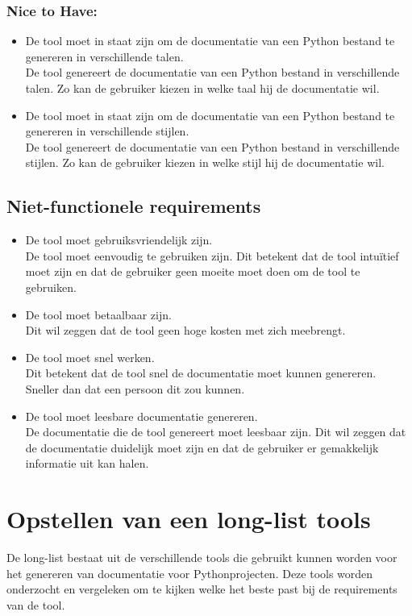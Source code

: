 \subsubsection{Nice to Have:}
\begin{itemize}
    \item De tool moet in staat zijn om de documentatie van een Python bestand te genereren in verschillende talen.\\
    De tool genereert de documentatie van een Python bestand in verschillende talen. Zo kan de gebruiker kiezen in welke taal hij de documentatie wil.
    \item De tool moet in staat zijn om de documentatie van een Python bestand te genereren in verschillende stijlen.\\
    De tool genereert de documentatie van een Python bestand in verschillende stijlen. Zo kan de gebruiker kiezen in welke stijl hij de documentatie wil.
\end{itemize}

\subsection{Niet-functionele requirements}
\label{sec:niet-functionele-requirements}
\begin{itemize}
    \item De tool moet gebruiksvriendelijk zijn.\\
    De tool moet eenvoudig te gebruiken zijn. Dit betekent dat de tool intuïtief moet zijn en dat de gebruiker geen moeite moet doen om de tool te gebruiken.
    \item De tool moet betaalbaar zijn.\\
    Dit wil zeggen dat de tool geen hoge kosten met zich meebrengt.
    \item De tool moet snel werken.\\
    Dit betekent dat de tool snel de documentatie moet kunnen genereren. Sneller dan dat een persoon dit zou kunnen.
    \item De tool moet leesbare documentatie genereren.\\
    De documentatie die de tool genereert moet leesbaar zijn. Dit wil zeggen dat de documentatie duidelijk moet zijn en dat de gebruiker er gemakkelijk informatie uit kan halen.    
\end{itemize}

\section{Opstellen van een long-list tools}
\label{sec:long-list}
De long-list bestaat uit de verschillende tools die gebruikt kunnen worden voor het genereren van documentatie voor Pythonprojecten.
Deze tools worden onderzocht en vergeleken om te kijken welke het beste past bij de requirements van de tool.

